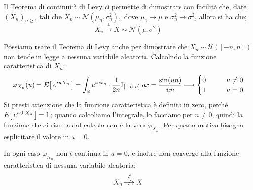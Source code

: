 \medskip
\noindent Il Teorema di continuità di Levy ci permette di dimostrare con facilità che, date $(X_n)_{n\geq1}$ tali che $X_n\sim\mathcal{N}(\mu_n, \sigma_n^2), $ dove $\mu_n\longrightarrow \mu$ e $\sigma^2_n\longrightarrow \sigma^2$, allora si ha che;
\[X_n\overset{\mathcal{L}}{\longrightarrow} X\sim\mathcal{N}(\mu, \sigma^2)\]

\begin{esempio}
    Possiamo usare il Teorema di Levy anche per dimostrare che $X_n\sim\mathcal{U}([-n, n])$ non tende in legge a nessuna variabile aleatoria. Calcolndo la funzione caratteristica di $X_n$:
    \[\varphi_{X_n}(u) = E\!\left[\,e^{iuX_n}\,\right] = \int_\mathbb Re^{iux_n}\cdot \frac{1}{2n}\mathbb{I}_{[-n, n]}\;dx = \frac{\sin(un)}{un}\longrightarrow\begin{cases}
        0\qquad & u\neq 0\\
        1 & u = 0
    \end{cases}\]
    Si presti attenzione che la funzione caratteristica è definita in zero, perché $E\!\left[\,e^{i\cdot 0\cdot X_n}\,\right] = 1$; quando calcoliamo l'integrale, lo facciamo per $n\neq 0$, quindi la funzione che ci risulta dal calcolo non è la vera $\varphi_{X_n}$. Per questo motivo bisogna esplicitare il valore in $u=0$. 

    \medskip
    \noindent In ogni caso $\varphi_{X_n}$ non è continua in $u=0$, e inoltre non converge alla funzione caratteristica di nessuna variabile aleatoria:
    \[X_n \overset{\mathcal{L}}{\;\not\!\!\!\longrightarrow} X\]
\end{esempio}

